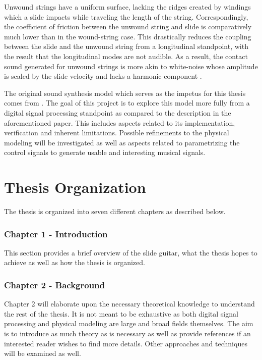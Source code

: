\documentclass[../main.tex]{subfiles}
\begin{document}
Unwound strings have a uniform surface, lacking the ridges created by windings which a slide impacts while traveling the length of the string. Correspondingly, the coefficient of friction between the unwound string and slide is comparatively much lower than in the wound-string case. This drastically reduces the coupling between the slide and the unwound string from a longitudinal standpoint, with the result that the longitudinal modes are not audible. As a result, the contact sound generated for unwound strings is more akin to white-noise whose amplitude is scaled by the slide velocity and lacks a harmonic component . 

The original sound synthesis model which serves as the impetus for this thesis comes from . The goal of this project is to explore this model more fully from a digital signal processing standpoint as compared to the description in the aforementioned paper. This includes aspects related to its implementation, verification and inherent limitations. Possible refinements to the physical modeling will be investigated as well as aspects related to parametrizing the control signals to generate usable and interesting musical signals.

\section{Thesis Organization}
The thesis is organized into seven different chapters as described below.

\subsubsection{Chapter 1 - Introduction}
This section provides a brief overview of the slide guitar, what the thesis hopes to achieve as well as how the thesis is organized.

\subsubsection{Chapter 2 - Background}
Chapter 2 will  elaborate upon the necessary theoretical knowledge to understand the rest of the thesis. It is not meant to be exhaustive as both digital signal processing and physical modeling are large and broad fields themselves. The aim is to introduce as much theory as is necessary as well as provide references if an interested reader wishes to find more details. Other approaches and techniques will be examined as well.
\end{document}
